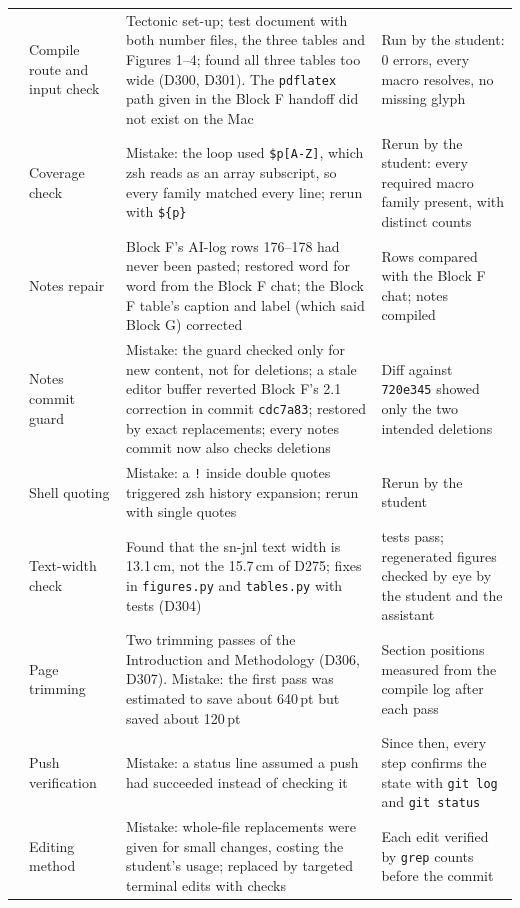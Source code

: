 \documentclass[11pt,a4paper]{report}
\begin{document}
{\begin{longtable}{
  >{\raggedright\arraybackslash}p{0.6cm}
  >{\raggedright\arraybackslash}p{4.4cm}
  >{\raggedright\arraybackslash}p{4.4cm}
  >{\raggedright\arraybackslash}p{4.8cm}}
201 & Compile route and input check
  & Tectonic set-up; test document with both number files, the three tables and Figures 1--4; found all three tables too wide (D300, D301). The \texttt{pdflatex} path given in the Block F handoff did not exist on the Mac
  & Run by the student: 0 errors, every macro resolves, no missing glyph \\
202 & Coverage check
  & Mistake: the loop used \texttt{\$p[A-Z]}, which zsh reads as an array subscript, so every family matched every line; rerun with \texttt{\$\{p\}}
  & Rerun by the student: every required macro family present, with distinct counts \\
203 & Notes repair
  & Block F's AI-log rows 176--178 had never been pasted; restored word for word from the Block F chat; the Block F table's caption and label (which said Block G) corrected
  & Rows compared with the Block F chat; notes compiled \\
  204 & Notes commit guard
  & Mistake: the guard checked only for new content, not for deletions; a stale editor buffer reverted Block F's 2.1 correction in commit \texttt{cdc7a83}; restored by exact replacements; every notes commit now also checks deletions
  & Diff against \texttt{720e345} showed only the two intended deletions \\
205 & Shell quoting
  & Mistake: a \texttt{!} inside double quotes triggered zsh history expansion; rerun with single quotes
  & Rerun by the student \\
206 & Text-width check
  & Found that the sn-jnl text width is 13.1\,cm, not the 15.7\,cm of D275; fixes in \texttt{figures.py} and \texttt{tables.py} with tests (D304)
  & 350 tests pass; regenerated figures checked by eye by the student and the assistant \\
207 & Page trimming
  & Two trimming passes of the Introduction and Methodology (D306, D307). Mistake: the first pass was estimated to save about 640\,pt but saved about 120\,pt
  & Section positions measured from the compile log after each pass \\
208 & Push verification
  & Mistake: a status line assumed a push had succeeded instead of checking it
  & Since then, every step confirms the state with \texttt{git log} and \texttt{git status} \\
209 & Editing method
  & Mistake: whole-file replacements were given for small changes, costing the student's usage; replaced by targeted terminal edits with checks
  & Each edit verified by \texttt{grep} counts before the commit \\

\end{longtable}}
\end{document}
